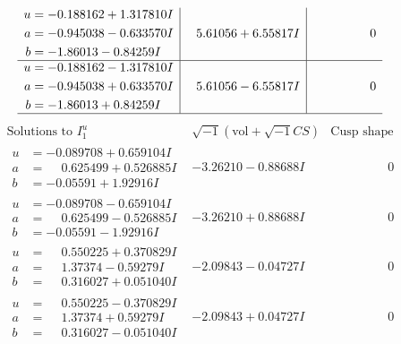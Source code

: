 \documentclass[1p]{elsarticle_modified}
\theoremstyle{definition}
\newcommand{\I}{\sqrt{-1}}
\begin{document}
$$\begin{array}{c|c|c}
\begin{aligned}
u &= -0.188162 + 1.317810 I \\
a &= -0.945038 - 0.633570 I \\
b &= -1.86013 - 0.84259 I\end{aligned}
 & \phantom{-}5.61056 + 6.55817 I & \phantom{-0.000000 } 0 \\ \hline\begin{aligned}
u &= -0.188162 - 1.317810 I \\
a &= -0.945038 + 0.633570 I \\
b &= -1.86013 + 0.84259 I\end{aligned}
 & \phantom{-}5.61056 - 6.55817 I & \phantom{-0.000000 } 0\\
 \hline 
 \end{array}$$\newpage$$\begin{array}{c|c|c}  
\text{Solutions to }I^u_{1}& \I (\text{vol} + \sqrt{-1}CS) & \text{Cusp shape}\\
 \hline 
\begin{aligned}
u &= -0.089708 + 0.659104 I \\
a &= \phantom{-}0.625499 + 0.526885 I \\
b &= -0.05591 + 1.92916 I\end{aligned}
 & -3.26210 - 0.88688 I & \phantom{-0.000000 } 0 \\ \hline\begin{aligned}
u &= -0.089708 - 0.659104 I \\
a &= \phantom{-}0.625499 - 0.526885 I \\
b &= -0.05591 - 1.92916 I\end{aligned}
 & -3.26210 + 0.88688 I & \phantom{-0.000000 } 0 \\ \hline\begin{aligned}
u &= \phantom{-}0.550225 + 0.370829 I \\
a &= \phantom{-}1.37374 - 0.59279 I \\
b &= \phantom{-}0.316027 + 0.051040 I\end{aligned}
 & -2.09843 - 0.04727 I & \phantom{-0.000000 } 0 \\ \hline\begin{aligned}
u &= \phantom{-}0.550225 - 0.370829 I \\
a &= \phantom{-}1.37374 + 0.59279 I \\
b &= \phantom{-}0.316027 - 0.051040 I\end{aligned}
 & -2.09843 + 0.04727 I & \phantom{-0.000000 } 0 \\ \hline\begin{aligned}

\end{aligned}
\end{array}$$
\end{document}
